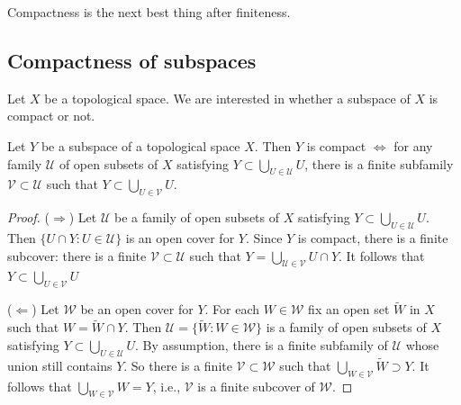 \documentclass[a4paper]{article}
\begin{document}
\begin{remark}
    Compactness is the next best thing after finiteness.
\end{remark}

\subsection{Compactness of subspaces}
Let $X$ be a topological space. We are interested in whether a subspace of $X$ is compact or not.
\begin{lemma}\label{lma:compactness of subspaces}
    Let $Y$ be a subspace of a topological space $X$. Then $Y$ is compact $\Longleftrightarrow$ for any family $\mathcal{U}$ of open subsets of $X$ satisfying $Y \subset \bigcup_{U \in \mathcal{U}} U$, there is a finite subfamily $\mathcal{V} \subset \mathcal{U}$ such that $Y \subset \bigcup_{U \in \mathcal{V}} U$.
\end{lemma}
\begin{proof}
    ($\Longrightarrow $) Let $\mathcal{U}$ be a family of open subsets of $X$ satisfying $Y \subset \bigcup_{U \in \mathcal{U}} U$. Then $\{U \cap Y: U \in \mathcal{U}\}$ is an open cover for $Y$. Since $Y$ is compact, there is a finite subcover: there is a finite $\mathcal{V} \subset \mathcal{U}$ such that $Y=\bigcup_{\mathcal{U} \in \mathcal{V}} U \cap Y$. It follows that $Y \subset \bigcup_{U \in \mathcal{V}} U$

    ($\Longleftarrow$) Let $\mathcal{W}$ be an open cover for $Y$. For each $W \in \mathcal{W}$ fix an open set $\widetilde{W}$ in $X$ such that $W=\widetilde{W} \cap Y$. Then $\mathcal{U}=\{\widetilde{W}: W \in \mathcal{W}\}$ is a family of open subsets of $X$ satisfying $Y \subset \bigcup_{U \in \mathcal{U}} U$. By assumption, there is a finite subfamily of $\mathcal{U}$ whose union still contains $Y$. So there is a finite $\mathcal{V} \subset \mathcal{W}$ such that $\bigcup_{W \in \mathcal{V}} \widetilde{W} \supset Y$. It follows that $\bigcup_{W \in \mathcal{V}} W=Y$, i.e., $\mathcal{V}$ is a finite subcover of $\mathcal{W}$.
\end{proof}
\end{document}
